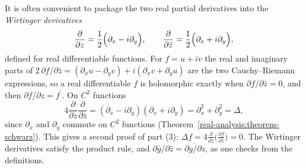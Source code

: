 It is often convenient to package the two real partial derivatives into the \emph{Wirtinger derivatives}
\[
\frac{\partial}{\partial z} = \frac12\Bigl(\partial_x - i\partial_y\Bigr), \qquad \frac{\partial}{\partial\bar z} = \frac12\Bigl(\partial_x + i\partial_y\Bigr),
\]
defined for real differentiable functions. For $f = u + iv$ the real and imaginary parts of $2\,\partial f/\partial\bar z = (\partial_xu - \partial_yv) + i(\partial_xv + \partial_yu)$ are the two
Cauchy--Riemann expressions, so a real differentiable $f$ is holomorphic exactly when $\partial f/\partial\bar z = 0$, and then $\partial f/\partial z = f^{\prime}$. On $C^2$ functions
\[
4\frac{\partial}{\partial z}\frac{\partial}{\partial\bar z} = (\partial_x - i\partial_y)(\partial_x + i\partial_y) = \partial_x^2 + \partial_y^2 = \Delta,
\]
since $\partial_x$ and $\partial_y$ commute on $C^2$ functions (Theorem~\ref{real-analysis:theorem-schwarz}). This gives a second proof of part (3): $\Delta f = 4\frac{\partial}{\partial z}\bigl(\frac{\partial f}{\partial\bar z}\bigr) = 0$.
The Wirtinger derivatives satisfy the product rule, and $\partial\bar g/\partial\bar z = \overline{\partial g/\partial z}$, as one checks from the definitions.

